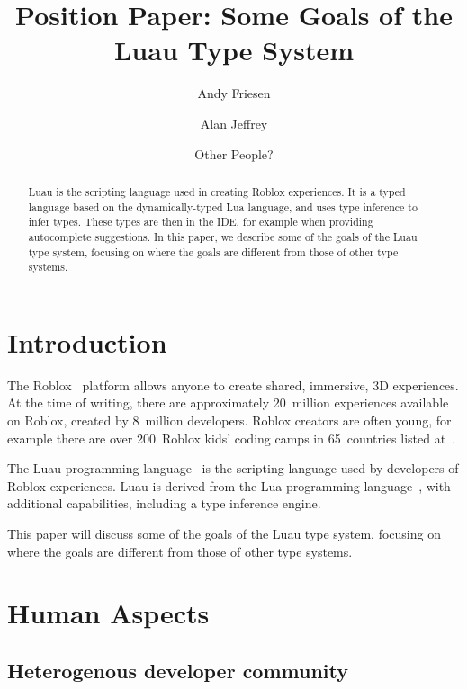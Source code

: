 \documentclass[acmsmall]{acmart}
\begin{document}
\title{Position Paper: Some Goals of the Luau Type System}

\author{Andy Friesen}
\author{Alan Jeffrey}
\author{Other People?}

\begin{abstract}
  Luau is the scripting language used in creating Roblox experiences.
  It is a typed language based on the dynamically-typed Lua language,
  and uses type inference to infer types. These types are then in the
  IDE, for example when providing autocomplete suggestions. In this
  paper, we describe some of the goals of the Luau type system,
  focusing on where the goals are different from those of other type systems.
\end{abstract}

\maketitle

\section{Introduction}

The Roblox~\cite{Roblox} platform allows anyone to create shared,
immersive, 3D experiences.  At the time of writing, there are
approximately 20~million experiences available on Roblox, created
by 8~million developers.  Roblox creators are often young, for
example there are over 200~Roblox kids' coding camps in 65~countries
listed at~\cite{AllEducators}.

The Luau programming language~\cite{Luau} is the scripting language
used by developers of Roblox experiences. Luau is derived from the Lua
programming language~\cite{Lua}, with additional capabilities,
including a type inference engine.

This paper will discuss some of the goals of the Luau type system,
focusing on where the goals are different from those of other type systems.

\section{Human Aspects}
\subsection{Heterogenous developer community}
\end{document}
